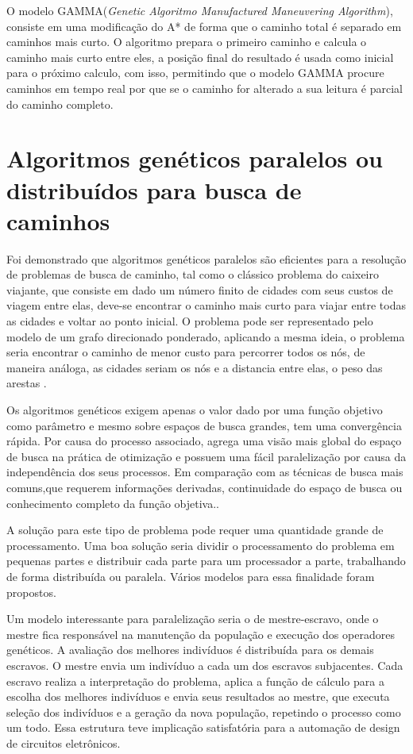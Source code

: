 O modelo GAMMA(\textit{Genetic Algoritmo Manufactured Maneuvering Algorithm}), consiste em uma modificação do A* de forma que o caminho total é separado em caminhos mais curto. O algoritmo prepara o primeiro caminho e calcula o caminho mais curto entre eles, a posição final do resultado é usada como inicial para o próximo calculo, com isso, permitindo que o modelo GAMMA procure caminhos em tempo real por que se o caminho for alterado a sua leitura é parcial do caminho completo.\cite{Ryan}



\section{Algoritmos genéticos paralelos ou distribuídos para busca de caminhos}

Foi demonstrado que algoritmos genéticos paralelos são eficientes para a resolução de problemas de busca de caminho, tal como o clássico problema do caixeiro viajante, que consiste em dado um número finito de cidades com seus custos de viagem entre elas, deve-se encontrar o caminho mais curto para viajar entre todas as cidades e voltar ao ponto inicial. O problema pode ser representado pelo modelo de um grafo direcionado ponderado, aplicando a mesma ideia, o problema seria encontrar o caminho de menor custo para percorrer todos os nós, de maneira análoga, as cidades seriam os nós e a distancia entre elas, o peso das arestas \cite{Jason}\cite{Alaoui}\cite{Heinz}.

Os algoritmos genéticos exigem apenas o valor dado por uma função objetivo como parâmetro e mesmo sobre espaços de busca grandes, tem uma convergência rápida. Por causa do processo associado, agrega uma visão mais global do espaço de busca na prática de otimização e possuem uma fácil paralelização por causa da independência dos seus processos. Em comparação com as técnicas de busca mais comuns,que requerem informações derivadas, continuidade do espaço de busca ou conhecimento completo da função objetiva.\cite{Vilson}.

A solução para este tipo de problema pode requer uma quantidade grande de processamento. Uma boa solução seria dividir o processamento do problema em pequenas partes e distribuir cada parte para um processador a parte, trabalhando de forma distribuída ou paralela. Vários modelos para essa finalidade foram propostos.

Um modelo interessante para paralelização seria o de mestre-escravo, onde o mestre fica responsável na manutenção da população e execução dos operadores genéticos. A avaliação dos melhores indivíduos é distribuída para os demais escravos. O mestre envia um indivíduo a cada um dos escravos subjacentes. Cada escravo realiza a interpretação do problema, aplica a função de cálculo para a escolha dos melhores indivíduos e envia seus resultados ao mestre, que executa seleção dos indivíduos e a geração da nova população, repetindo o processo como um todo. Essa estrutura teve implicação satisfatória para a automação de design de circuitos eletrônicos. \cite{Jason}

